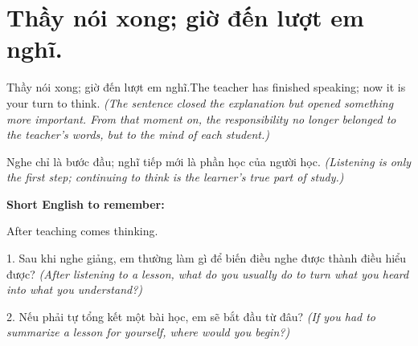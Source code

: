 \section{Thầy nói xong; giờ đến lượt em nghĩ.}
\begin{truyen}{Thầy nói xong; giờ đến lượt em nghĩ.}{The teacher has finished speaking; now it is your turn to think.}
\textit{(The sentence closed the explanation but opened something more important. From that moment on, the responsibility no longer belonged to the teacher's words, but to the mind of each student.)}
\end{truyen}

\begin{baihoc}
Nghe chỉ là bước đầu; nghĩ tiếp mới là phần học của người học.
\textit{(Listening is only the first step; continuing to think is the learner's true part of study.)}
\end{baihoc}

\begin{ghinhoanh}
\textbf{Short English to remember:}

After teaching comes thinking.

\end{ghinhoanh}

\begin{tuhocnhanh}
1. Sau khi nghe giảng, em thường làm gì để biến điều nghe được thành điều hiểu được? \textit{(After listening to a lesson, what do you usually do to turn what you heard into what you understand?)}

2. Nếu phải tự tổng kết một bài học, em sẽ bắt đầu từ đâu? \textit{(If you had to summarize a lesson for yourself, where would you begin?)}
\end{tuhocnhanh}
\ngancach

